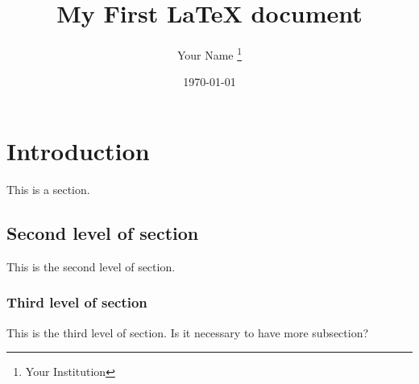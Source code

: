 \documentclass{article}
\title{My First \LaTeX{} document}
\author{Your Name \thanks{Your Institution}}
\date{\today}
\begin{document}
\maketitle

\tableofcontents

\section{Introduction}

This is a section.

\subsection{Second level of section}

This is the second level of section.

\subsubsection{Third level of section}

This is the third level of section.
Is it necessary to have more subsection?
\end{document}
